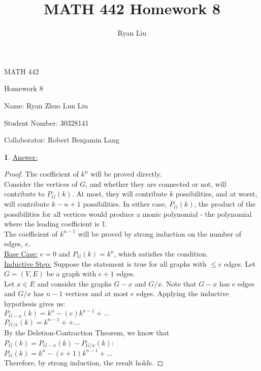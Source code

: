 \documentclass[12pt,a4paper]{article}
\author{Ryan Liu}
\title{MATH 442 Homework 8}
\theoremstyle{definition}
\newtheorem{problem}{}
\begin{document}
\begin{center}
{\huge MATH 442 \par}
{\Large Homework  8  \par}
{\normalsize Name: Ryan Zhuo Lun Liu \par}
{\normalsize Student Number: 30328141 \par}
{\normalsize Collaborator: Robert Benjamin Lang \par}
\end{center}

\begin{problem} \underline{Answer:}
\begin{proof} 
The coefficient of $k^n$ will be proved directly.\\

Consider the vertices of $G$, and whether they are connected or not, will contribute to $P_G(k)$. At most, they will contribute $k$ possibilities, and at worst, will contribute $k - n + 1$ possibilities. In either case, $P_G(k)$, the product of the possibilities for all vertices would produce a monic polynomial - the polynomial where the leading coefficient is 1. \\

The coefficient of $k^{n - 1}$ will be proved by strong induction on the number of edges, $e$. \\

\underline{Base Case:} $e = 0$ and $P_G(k) = k^n$, which satisfies the condition. \\
\underline{Inductive Step:} Suppose the statement is true for all graphs with $\leq e$ edges. Let $G = (V, E)$ be a graph with $e + 1$ edges. \\

Let $x \in E$ and consider the graphs $G - x$ and $G/x$. Note that $G - x$ has $e$ edges and $G/x$ has $n - 1$ vertices and at most $e$ edges. Applying the inductive hypothesis gives us: \\

$P_{G - x}(k) = k^n - (e)k^{n - 1} + ...$ \\
$P_{G/x}(k) = k^{n - 1} + + ...$ \\

By the Deletion-Contraction Theorem, we know that $P_G(k) = P_{G - x}(k) - P_{G/x}(k)$: \\

$P_G(k) = k^n - (e + 1)k^{n - 1} + ...$ \\

Therefore, by strong induction, the result holds. 
\end{proof}
\end{problem}
\end{document}
